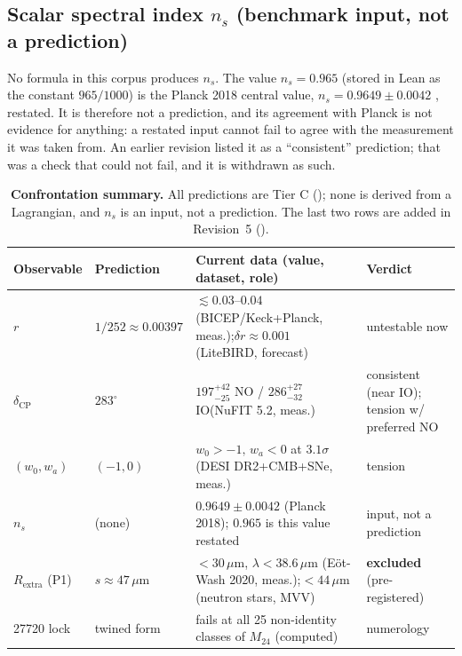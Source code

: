 \documentclass[11pt,a4paper]{article}
\theoremstyle{remark}
\begin{document}
\subsection{Scalar spectral index \texorpdfstring{$n_s$}{ns} (benchmark input, not a prediction)}
No formula in this corpus produces $n_s$. The value $n_s=0.965$ (stored in Lean as the constant
$965/1000$) is the Planck 2018 central value, $n_s=0.9649\pm0.0042$ \cite{Planck2018}, restated. It is
therefore not a prediction, and its agreement with Planck is not evidence for anything: a restated
input cannot fail to agree with the measurement it was taken from. An earlier revision listed it as a
``consistent'' prediction; that was a check that could not fail, and it is withdrawn as such.

\begin{table}[htbp]
\centering
\footnotesize
\caption{\textbf{Confrontation summary.} All predictions are Tier C (); none
is derived from a Lagrangian, and $n_s$ is an input, not a prediction. The last two rows are added in
Revision~5 ().}
\label{tab:phenomenology}
\begin{tabular}{@{}l l >{\raggedright\arraybackslash}p{5.8cm} >{\raggedright\arraybackslash}p{2.1cm}@{}}
\toprule
\textbf{Observable} & \textbf{Prediction} & \textbf{Current data (value, dataset, role)} & \textbf{Verdict} \\
\midrule
$r$ & $1/252\approx0.00397$ & $\lesssim0.03$--$0.04$ (BICEP/Keck+Planck, meas.);\newline $\delta r\approx0.001$ (LiteBIRD, forecast) & untestable now \\[2pt]
$\delta_{\mathrm{CP}}$ & $283^\circ$ & $197^{+42}_{-25}$ NO / $286^{+27}_{-32}$ IO\newline (NuFIT 5.2, meas.) & consistent (near IO); tension w/ preferred NO \\[2pt]
$(w_0,w_a)$ & $(-1,0)$ & $w_0>-1,\,w_a<0$ at $3.1\sigma$\newline (DESI DR2+CMB+SNe, meas.) & tension \\[2pt]
$n_s$ & (none) & $0.9649\pm0.0042$ (Planck 2018); $0.965$ is this value restated & input, not a prediction \\[2pt]
$R_{\mathrm{extra}}$ (P1) & $s\approx47\,\mu$m & $<30\,\mu$m, $\lambda<38.6\,\mu$m (E\"ot-Wash 2020, meas.);\newline $<44\,\mu$m (neutron stars, MVV) & \textbf{excluded} (pre-registered) \\[2pt]
27720 lock & twined form & fails at all 25 non-identity classes of $M_{24}$ (computed) & numerology \\
\bottomrule
\end{tabular}
\end{table}
\end{document}
